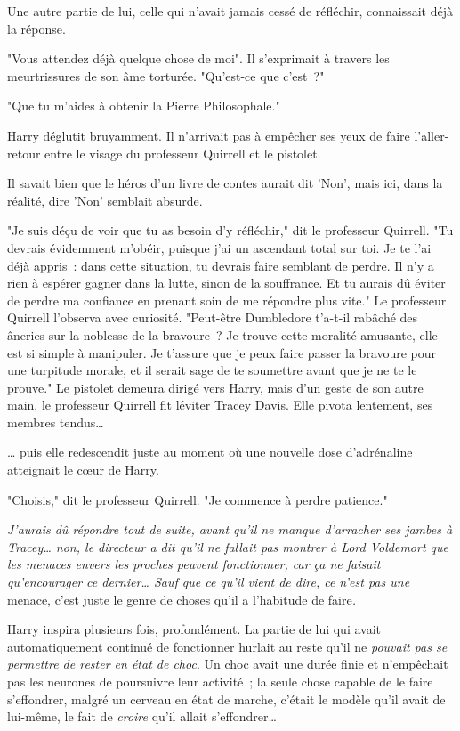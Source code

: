 Une autre partie de lui, celle qui n'avait jamais cessé de réfléchir, connaissait déjà la réponse.

"Vous attendez déjà quelque chose de moi". Il s'exprimait à travers les meurtrissures de son âme torturée. "Qu'est-ce que c'est~?"

"Que tu m'aides à obtenir la Pierre Philosophale."

Harry déglutit bruyamment. Il n'arrivait pas à empêcher ses yeux de faire l'aller-retour entre le visage du professeur Quirrell et le pistolet.

Il savait bien que le héros d'un livre de contes aurait dit 'Non', mais ici, dans la réalité, dire 'Non' semblait absurde.

"Je suis déçu de voir que tu as besoin d'y réfléchir," dit le professeur Quirrell. "Tu devrais évidemment m'obéir, puisque j'ai un ascendant total sur toi. Je te l'ai déjà appris~: dans cette situation, tu devrais faire semblant de perdre. Il n'y a rien à espérer gagner dans la lutte, sinon de la souffrance. Et tu aurais dû éviter de perdre ma confiance en prenant soin de me répondre plus vite." Le professeur Quirrell l'observa avec curiosité. "Peut-être Dumbledore t'a-t-il rabâché des âneries sur la noblesse de la bravoure~? Je trouve cette moralité amusante, elle est si simple à manipuler. Je t'assure que je peux faire passer la bravoure pour une turpitude morale, et il serait sage de te soumettre avant que je ne te le prouve." Le pistolet demeura dirigé vers Harry, mais d'un geste de son autre main, le professeur Quirrell fit léviter Tracey Davis. Elle pivota lentement, ses membres tendus…

… puis elle redescendit juste au moment où une nouvelle dose d'adrénaline atteignait le cœur de Harry.

"Choisis," dit le professeur Quirrell. "Je commence à perdre patience."

\emph{J'aurais dû répondre tout de suite, avant qu'il ne manque d'arracher ses jambes à Tracey… non, le directeur a dit qu'il ne fallait pas montrer à Lord Voldemort que les menaces envers les proches peuvent fonctionner, car ça ne faisait qu'encourager ce dernier… Sauf que ce qu'il vient de dire, ce n'est pas une} menace, c'est juste le genre de choses qu'il a l'habitude de faire\emph{.}

Harry inspira plusieurs fois, profondément. La partie de lui qui avait automatiquement continué de fonctionner hurlait au reste qu'il ne \emph{pouvait pas se permettre de rester en état de choc}. Un choc avait une durée finie et n'empêchait pas les neurones de poursuivre leur activité~; la seule chose capable de le faire s'effondrer, malgré un cerveau en état de marche, c'était le modèle qu'il avait de lui-même, le fait de \emph{croire} qu'il allait s'effondrer…

